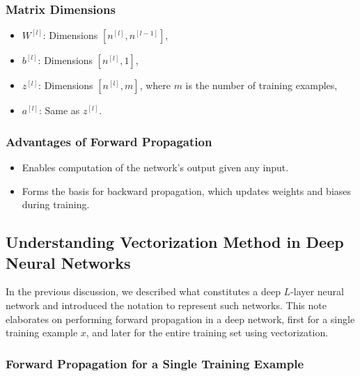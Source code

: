 \documentclass[letterpaper,12pt,notitlepage,twoside]{report}
\begin{document}
\subsubsection*{Matrix Dimensions}

\begin{itemize}
    \item \( W^{[l]} \): Dimensions \( [n^{[l]}, n^{[l-1]}] \),
    \item \( b^{[l]} \): Dimensions \( [n^{[l]}, 1] \),
    \item \( z^{[l]} \): Dimensions \( [n^{[l]}, m] \), where \( m \) is the number of training examples,
    \item \( a^{[l]} \): Same as \( z^{[l]} \).
\end{itemize}

\subsubsection*{Advantages of Forward Propagation}
\begin{itemize}
    \item Enables computation of the network's output given any input.
    \item Forms the basis for backward propagation, which updates weights and biases during training.
\end{itemize}

\subsection{Understanding Vectorization Method in Deep Neural Networks}

In the previous discussion, we described what constitutes a deep \( L \)-layer neural network and introduced the notation to represent such networks. This note elaborates on performing forward propagation in a deep network, first for a single training example \( x \), and later for the entire training set using vectorization.

\subsubsection{Forward Propagation for a Single Training Example}
\end{document}
